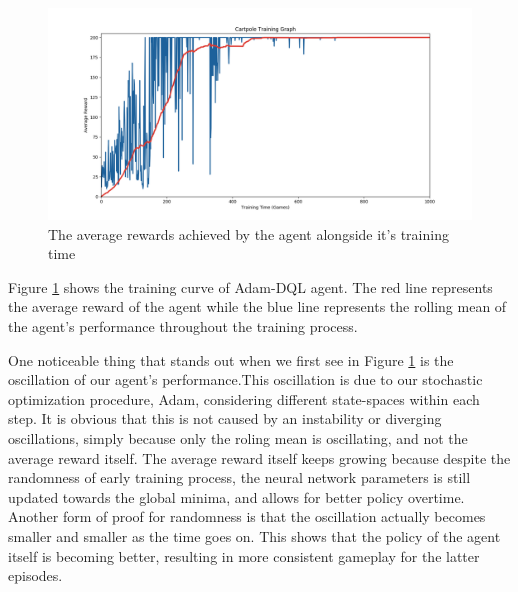         \begin{figure}[H]
            \centering
            \includegraphics[scale=0.4]{images/Cartpole_Training_Graph.png}
            \caption{The average rewards achieved by the agent alongside it's training time}
            \label{fig:cartpole1}
        \end{figure}
        Figure \ref{fig:cartpole1} shows the training curve of Adam-DQL agent. The red line represents the average reward of the agent while the blue line represents the rolling mean of the agent's performance throughout the training process.
        \par
        One noticeable thing that stands out when we first see in Figure \ref{fig:cartpole1} is the
        oscillation of our agent's performance.This oscillation is due to our
        stochastic optimization procedure, Adam, considering different state-spaces within each step. It is obvious that this is not caused by an instability or diverging oscillations, simply because only the roling mean is oscillating, and not the average reward itself. The average reward itself keeps growing because despite the randomness of early training process, the neural network parameters is still updated towards the global minima, and allows for better policy overtime. Another form of proof for randomness is that the oscillation actually becomes smaller and smaller as the time goes on. This shows that the policy of the agent itself is becoming better, resulting in more consistent gameplay for the latter episodes. 
        

